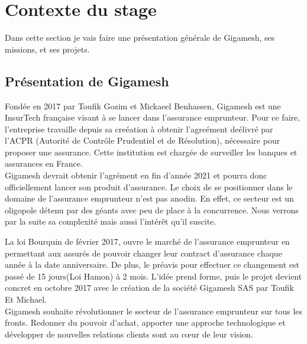 
\chapter{Contexte du stage} %

\label{Chaptre1} %

Dans cette section je vais faire une présentation générale de Gigamesh, ses missions, et ses projets.


\newcommand{\keyword}[1]{\textbf{#1}}
\newcommand{\tabhead}[1]{\textbf{#1}}
\newcommand{\code}[1]{\texttt{#1}}
\newcommand{\file}[1]{\texttt{\bfseries#1}}
\newcommand{\option}[1]{\texttt{\itshape#1}}

\section{Présentation de Gigamesh }

Fondée en 2017 par Toufik Gozim et Mickaeel Benhassen, Gigamesh est une InsurTech française visant à se lancer dans l’assurance emprunteur. Pour ce faire, l’entreprise travaille depuis sa creéation à obtenir l’agreément deélivré par l’ACPR (Autorité de Contrôle Prudentiel et de Résolution), nécessaire pour proposer une assurance. Cette institution est chargée de surveiller les banques et assurances en France.				
\\

Gigamesh  devrait obtenir l’agrément en fin d’année 2021 et pourra donc officiellement lancer son produit d’assurance. Le choix de se positionner dans le domaine de l’assurance emprunteur n’est pas anodin. En effet, ce secteur est un oligopole détenu par des géants avec peu de place à la concurrence. Nous verrons par la suite sa complexité mais aussi l’intérêt qu’il suscite.

La loi Bourquin de février 2017, ouvre le marché de l'assurance emprunteur en permettant aux assurés de pouvoir changer leur contract d'assurance chaque année à la date anniversaire. De plus, le préavis pour effectuer ce changement est passé de 15 jours(Loi Hamon) à 2 mois. L'idée prend forme, puis le projet devient concret en octobre 2017 avec le création de la société Gigamesh SAS par Toufik Et Michael.
\\	
Gigamesh souhaite révolutionner le secteur de l’assurance emprunteur sur tous les fronts. Redonner du pouvoir d’achat, apporter une approche technologique et développer de nouvelles relations clients sont au cœur de leur vision. 



